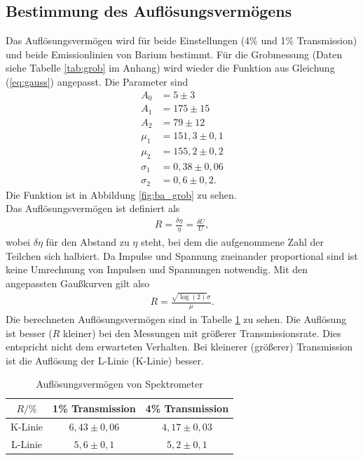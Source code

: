 \subsection{Bestimmung des Auflösungsvermögens}
Das Auflösungsvermögen wird für beide Einstellungen (4\% und 1\% Transmission) und beide Emissionlinien von Barium bestimmt. Für die Grobmessung (Daten siehe Tabelle \ref{tab:grob} im Anhang) wird wieder die Funktion aus Gleichung (\ref{eq:gauss}) angepasst. Die Parameter sind
\begin{align*}
  A_0&=5\pm 3\\
  A_1&=175\pm 15\\
  A_2&=79\pm 12\\
  \mu_1&=151,3 \pm 0,1\\
  \mu_2&=155,2 \pm 0,2\\
  \sigma_1&=0,38 \pm 0,06\\
  \sigma_2&=0,6 \pm 0,2.
\end{align*}
Die Funktion ist in Abbildung \ref{fig:ba_grob} zu sehen.\\

Das Auflösungsvermögen ist definiert als
\begin{align*}
  R=\frac{\delta\eta}{\eta}=\frac{\delta U}{U},
\end{align*}
wobei $\delta\eta$ für den Abstand zu $\eta$ steht, bei dem die aufgenommene Zahl der Teilchen sich halbiert. Da Impulse und Spannung zueinander proportional sind ist keine Umrechnung von Impulsen und Spannungen notwendig. Mit den angepassten Gaußkurven gilt also 
\begin{align*}
  R=\frac{\sqrt{\log(2)} \sigma}{\mu}.
\end{align*}
Die berechneten Auflösungsvermögen sind in Tabelle \ref{tab:aufloesung} zu sehen. Die Auflösung ist besser ($R$ kleiner) bei den Messungen mit größerer Transmissionsrate. Dies entspricht nicht dem erwarteten Verhalten. Bei kleinerer (größerer) Transmission ist die Auflösung der L-Linie (K-Linie) besser.

\begin{table}[h]
    \centering
    \caption{Auflösungsvermögen von Spektrometer}
    \label{tab:aufloesung}
    \begin{tabular}{c | c c}
      \toprule
       $R/ \%$ & 1\% Transmission & 4\% Transmission \\
      \midrule
      K-Linie & $6,43 \pm 0,06$ & $4,17 \pm 0,03$\\
      L-Linie & $5,6 \pm 0,1$ & $5,2 \pm 0,1$\\
      \bottomrule
    \end{tabular}
  \end{table}

